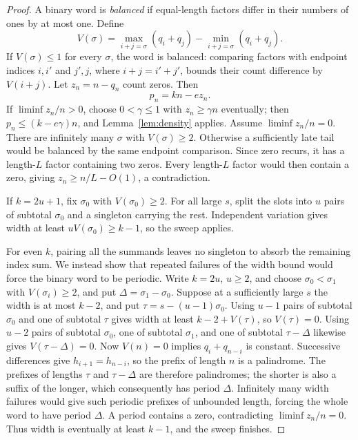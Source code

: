 \documentclass[11pt,a4paper,reqno]{amsart}
\theoremstyle{definition}
\theoremstyle{remark}
\begin{document}
\begin{proof}
\medskip
A binary word is \emph{balanced} if equal-length factors differ in their
numbers of ones by at most one. Define
\[
 V(\sigma)=\max_{i+j=\sigma}(q_i+q_j)-\min_{i+j=\sigma}(q_i+q_j).
\]
If $V(\sigma)\le1$ for every $\sigma$, the word is balanced: comparing
factors with endpoint indices $i,i'$ and $j',j$, where
$i+j=i'+j'$, bounds their count difference by $V(i+j)$.
Let $z_n=n-q_n$ count zeros. Then
\begin{equation}\label{eq:zero-frequency}
 p_n=kn-ez_n.
\end{equation}
If $\liminf z_n/n>0$, choose $0<\gamma\le1$ with $z_n\ge\gamma n$
eventually; then $p_n\le(k-e\gamma)n$, and Lemma~\ref{lem:density} applies.
Assume $\liminf z_n/n=0$. There are infinitely many $\sigma$ with
$V(\sigma)\ge2$. Otherwise a sufficiently late tail would be balanced
by the same endpoint comparison. Since zero recurs, it has a length-$L$
factor containing two zeros. Every length-$L$ factor would then contain a
zero, giving $z_n\ge n/L-O(1)$, a contradiction.

If $k=2u+1$, fix $\sigma_0$ with $V(\sigma_0)\ge2$. For all large $s$,
split the slots into $u$ pairs of subtotal $\sigma_0$ and a singleton
carrying the rest. Independent variation gives width at least
$uV(\sigma_0)\ge k-1$, so the sweep applies.

For even $k$, pairing all the summands leaves no singleton to absorb the
remaining index sum. We instead show that repeated failures of the width
bound would force the binary word to be periodic.
Write $k=2u$, $u\ge2$, and choose $\sigma_0<\sigma_1$ with
$V(\sigma_i)\ge2$, and put $\Delta=\sigma_1-\sigma_0$.
Suppose at a sufficiently large $s$ the width is at most $k-2$, and put
$\tau=s-(u-1)\sigma_0$. Using $u-1$ pairs of subtotal $\sigma_0$ and one
of subtotal $\tau$ gives width at least $k-2+V(\tau)$, so $V(\tau)=0$.
Using $u-2$ pairs of subtotal $\sigma_0$, one of subtotal $\sigma_1$, and
one of subtotal $\tau-\Delta$ likewise gives $V(\tau-\Delta)=0$.
Now $V(n)=0$ implies $q_i+q_{n-i}$ is constant. Successive differences
give $h_{i+1}=h_{n-i}$, so the prefix of length $n$ is a palindrome.
The prefixes of lengths $\tau$ and $\tau-\Delta$ are therefore palindromes;
the shorter is also a suffix of the longer, which consequently has period
$\Delta$. Infinitely many width failures would give such periodic prefixes
of unbounded length, forcing the whole word to have period $\Delta$.
A period contains a zero, contradicting $\liminf z_n/n=0$.
Thus width is eventually at least $k-1$, and the sweep finishes.
\end{proof}
\end{document}
